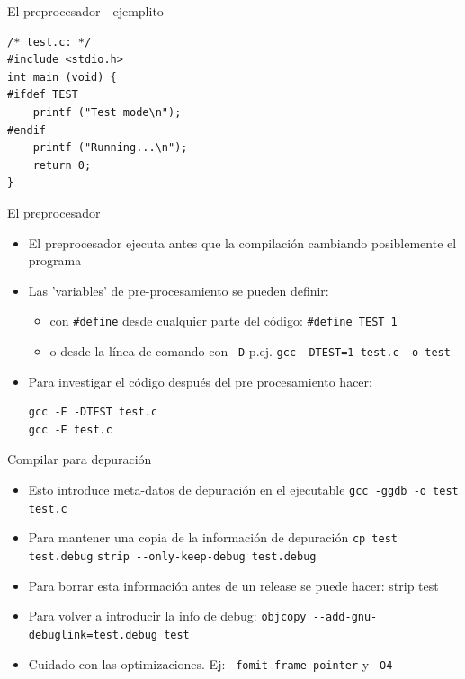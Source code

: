 \documentclass[xetex]{beamer}
\begin{document}
\begin{frame}[fragile]{El preprocesador - ejemplito }
  

\begin{lstlisting}
/* test.c: */
#include <stdio.h>
int main (void) {
#ifdef TEST
    printf ("Test mode\n");
#endif
    printf ("Running...\n");
    return 0;
}
\end{lstlisting}
\end{frame}

\begin{frame}[fragile]{El preprocesador}
\begin{itemize}
  \item El preprocesador ejecuta antes que la compilación cambiando posiblemente el
    programa
  \item Las 'variables' de pre-procesamiento se pueden definir:
\begin{itemize}
  \item con \verb=#define= desde cualquier parte del código:
\verb=#define TEST 1=
  \item o desde la línea de comando con \verb=-D= p.ej.
\verb#gcc -DTEST=1 test.c -o test#
\end{itemize}
  \item Para investigar el código después del pre procesamiento hacer:
\begin{verbatim}
gcc -E -DTEST test.c
gcc -E test.c
\end{verbatim}
\end{itemize}
\end{frame}


\begin{frame}[fragile]{Compilar para depuración}

\begin{itemize}
  \item Esto introduce meta-datos de depuración en el ejecutable
\verb=gcc -ggdb -o test test.c=
  \item Para mantener una copia de la información de depuración
\verb=cp test test.debug=
\verb=strip --only-keep-debug test.debug=
  \item Para borrar esta información antes de un release se puede hacer:
strip test
  \item Para volver a introducir la info de debug:
\verb#objcopy --add-gnu-debuglink=test.debug test#
  \item Cuidado con las optimizaciones. Ej: \verb=-fomit-frame-pointer= y \verb=-O4=
\end{itemize}
\end{frame}
\end{document}
